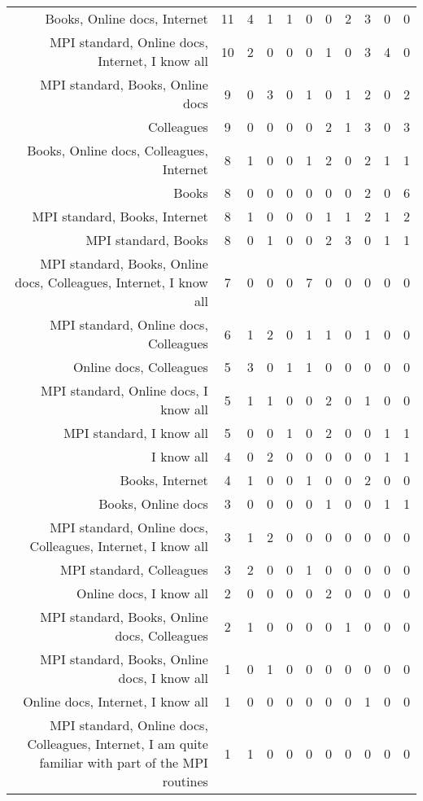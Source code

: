 {\begin{landscape}
\begin{longtable}[htb]{r|c|c|c|c|c|c|c|c|c|c}
{Books, Online docs, Internet} & 11 & 4 & 1 & 1 & 0 & 0 & 2 & 3 & 0 & 0 \\%
{MPI standard, Online docs, Internet, I know all} & 10 & 2 & 0 & 0 & 0 & 1 & 0 & 3 & 4 & 0 \\%
{MPI standard, Books, Online docs} & 9 & 0 & 3 & 0 & 1 & 0 & 1 & 2 & 0 & 2 \\%
{Colleagues} & 9 & 0 & 0 & 0 & 0 & 2 & 1 & 3 & 0 & 3 \\%
{Books, Online docs, Colleagues, Internet} & 8 & 1 & 0 & 0 & 1 & 2 & 0 & 2 & 1 & 1 \\%
{Books} & 8 & 0 & 0 & 0 & 0 & 0 & 0 & 2 & 0 & 6 \\%
{MPI standard, Books, Internet} & 8 & 1 & 0 & 0 & 0 & 1 & 1 & 2 & 1 & 2 \\%
{MPI standard, Books} & 8 & 0 & 1 & 0 & 0 & 2 & 3 & 0 & 1 & 1 \\%
{MPI standard, Books, Online docs, Colleagues, Internet, I know all} & 7 & 0 & 0 & 0 & 7 & 0 & 0 & 0 & 0 & 0 \\%
{MPI standard, Online docs, Colleagues} & 6 & 1 & 2 & 0 & 1 & 1 & 0 & 1 & 0 & 0 \\%
{Online docs, Colleagues} & 5 & 3 & 0 & 1 & 1 & 0 & 0 & 0 & 0 & 0 \\%
{MPI standard, Online docs, I know all} & 5 & 1 & 1 & 0 & 0 & 2 & 0 & 1 & 0 & 0 \\%
{MPI standard, I know all} & 5 & 0 & 0 & 1 & 0 & 2 & 0 & 0 & 1 & 1 \\%
{I know all} & 4 & 0 & 2 & 0 & 0 & 0 & 0 & 0 & 1 & 1 \\%
{Books, Internet} & 4 & 1 & 0 & 0 & 1 & 0 & 0 & 2 & 0 & 0 \\%
{Books, Online docs} & 3 & 0 & 0 & 0 & 0 & 1 & 0 & 0 & 1 & 1 \\%
{MPI standard, Online docs, Colleagues, Internet, I know all} & 3 & 1 & 2 & 0 & 0 & 0 & 0 & 0 & 0 & 0 \\%
{MPI standard, Colleagues} & 3 & 2 & 0 & 0 & 1 & 0 & 0 & 0 & 0 & 0 \\%
{Online docs, I know all} & 2 & 0 & 0 & 0 & 0 & 2 & 0 & 0 & 0 & 0 \\%
{MPI standard, Books, Online docs, Colleagues} & 2 & 1 & 0 & 0 & 0 & 0 & 1 & 0 & 0 & 0 \\%
{MPI standard, Books, Online docs, I know all} & 1 & 0 & 1 & 0 & 0 & 0 & 0 & 0 & 0 & 0 \\%
{Online docs, Internet, I know all} & 1 & 0 & 0 & 0 & 0 & 0 & 0 & 1 & 0 & 0 \\%
{MPI standard, Online docs, Colleagues, Internet, I am quite familiar with part of the MPI routines} & 1 & 1 & 0 & 0 & 0 & 0 & 0 & 0 & 0 & 0 \\%

\end{longtable}
\end{landscape}}
